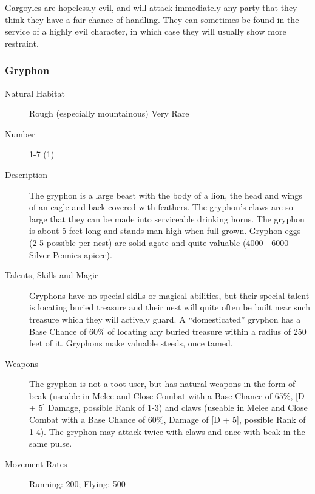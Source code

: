 \begin{multicols}{2}
\begin{description}
\setlength\itemsep{0pt}

\item[Comments] Gargoyles are hopelessly evil, and will attack immediately
any party that they think they have a fair chance of handling. They
can sometimes be found in the service of a highly evil character, in
which case they will usually show more restraint.

\end{description}

\subsubsection{Gryphon}

\begin{description}
\item[Natural Habitat] Rough (especially mountainous) Very Rare

\item[Number] 1-7 (1)

\item[Description] The gryphon is a large beast with the body of a lion, the head
and wings of an eagle and back covered with feathers. The gryphon's
claws are so large that they can be made into serviceable drinking
horns. The gryphon is about 5 feet long and stands man-high when full
grown. Gryphon eggs (2-5 possible per nest) are solid agate and quite
valuable (4000 - 6000 Silver Pennies apiece).

\item[Talents, Skills and Magic] Gryphons have no special skills or magical abilities, but
their special talent is locating buried treasure and their nest will
quite often be built near such treasure which they will actively
guard. A ``domesticated'' gryphon has a Base Chance of 60\% of
locating any buried treasure within a radius of 250 feet of
it. Gryphons make valuable steeds, once tamed.

\item[Weapons] The gryphon is not a toot user, but has natural weapons in
the form of beak (useable in Melee and Close Combat with a Base Chance
of 65\%, [D + 5] Damage, possible Rank of 1-3) and claws (useable
in Melee and Close Combat with a Base Chance of 60\%, Damage of
[D + 5], possible Rank of 1-4). The gryphon may attack twice with
claws and once with beak in the same pulse.


\item[Movement Rates] Running: 200; Flying: 500


\end{description}
\end{multicols}
